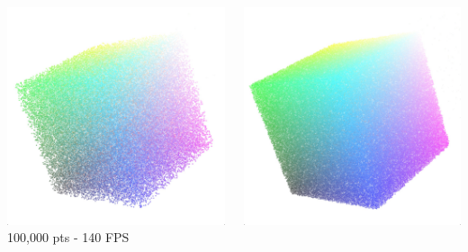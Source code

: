 \documentclass[10pt]{beamer}
\begin{document}
\begin{frame}
\begin{block}{}
\begin{columns}
\begin{column}{.225\textwidth}
\begin{center}
        \includegraphics[width=\textwidth]{scatter-3}\\
        \tiny 100,000 pts - 140 FPS
        \end{center}
      \end{column}
      \begin{column}{.225\textwidth}
        \begin{center}
        \includegraphics[width=\textwidth]{scatter-4}\\

\end{center}
\end{column}
\end{columns}
\end{block}
\end{frame}
\end{document}
